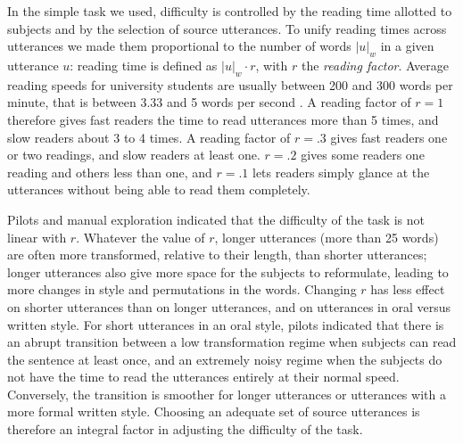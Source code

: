 In the simple task we used, difficulty is controlled by the reading time
allotted to subjects and by the selection of source utterances. To unify reading times
 across utterances we made them proportional to the number of words \(|u|_w\) in a given utterance \(u\): 
reading time is defined as \(|u|_w \cdot r\), with \(r\) the
\emph{reading factor}. Average reading speeds for university students
are usually between 200 and 300 words per minute, that is between 3.33
and 5 words per second \autocite%
{rayner_eye_2010}. A reading factor of \(r = 1\) therefore gives fast readers the time to read
utterances more than 5 times, and slow readers about 3 to 4 times. A
reading factor of \(r = .3\) gives fast readers one or two readings, and
slow readers at least one. \(r = .2\) gives some readers one reading and
others less than one, and \(r = .1\) lets readers simply glance at the
utterances without being able to read them completely.

Pilots and manual exploration indicated that the difficulty of the task
is not linear with \(r\). Whatever the value of \(r\), longer utterances
(more than 25 words) are often more transformed, relative to their
length, than shorter utterances; longer utterances also give more space
for the subjects to reformulate, leading to more changes in style and
permutations in the words. Changing \(r\) has less effect on shorter
utterances than on longer utterances, and on utterances in oral versus
written style. For short utterances in an oral style, pilots indicated
that there is an abrupt transition between a low transformation regime
when subjects can read the sentence at least once, and an extremely
noisy regime when the subjects do not have the time to read the
utterances entirely at their normal speed. Conversely, the transition is
smoother for longer utterances or utterances with a more formal written
style. Choosing an adequate set of source utterances is therefore an
integral factor in adjusting the difficulty of the task.

